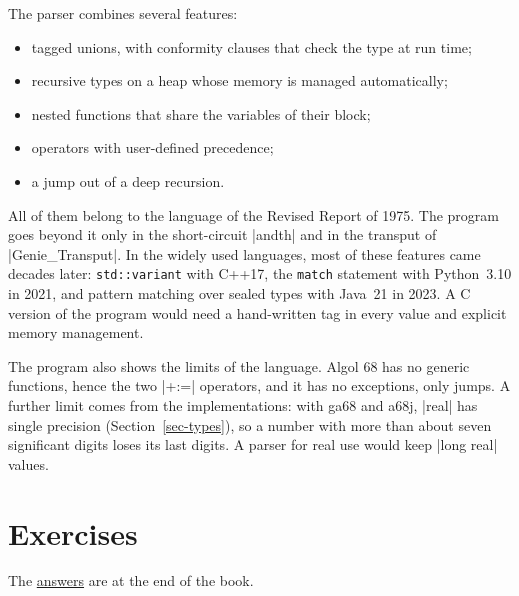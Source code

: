 The parser combines several features:
\begin{itemize}
\item tagged unions, with conformity clauses that check the type at run
  time;
\item recursive types on a heap whose memory is managed automatically;
\item nested functions that share the variables of their block;
\item operators with user-defined precedence;
\item a jump out of a deep recursion.
\end{itemize}
All of them belong to the language of the Revised Report of 1975. The
program goes beyond it only in the short-circuit \code|andth| and in the
transput of \code|Genie_Transput|. In the widely used languages, most of these
features came decades later: \texttt{std::variant} with C++17, the
\texttt{match} statement with Python~3.10 in 2021, and pattern matching
over sealed types with Java~21 in 2023. A C version of the program would
need a hand-written tag in every value and explicit memory management.

The program also shows the limits of the language. Algol 68 has no
generic functions, hence the two \code|+:=| operators, and it has no
exceptions, only jumps. A further limit comes from the implementations:
with ga68 and a68j, \code|real| has single precision
(Section~\ref{sec-types}), so a number with more than about seven
significant digits loses its last digits. A parser for real use would
keep \code|long real| values.

\section*{Exercises}

The \hyperref[ans-ch7]{answers} are at the end of the book.

